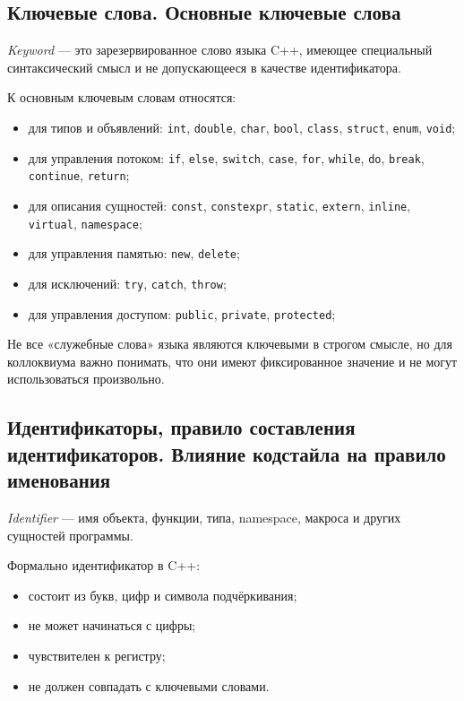 \subsection{Ключевые слова. Основные ключевые слова}
\begin{definition}
\textit{Keyword} — это зарезервированное слово языка C++, имеющее специальный синтаксический смысл и не допускающееся в качестве идентификатора.
\end{definition}

К основным ключевым словам относятся:
\begin{itemize}
    \item для типов и объявлений: \texttt{int}, \texttt{double}, \texttt{char}, \texttt{bool}, \texttt{class}, \texttt{struct}, \texttt{enum}, \texttt{void};
    \item для управления потоком: \texttt{if}, \texttt{else}, \texttt{switch}, \texttt{case}, \texttt{for}, \texttt{while}, \texttt{do}, \texttt{break}, \texttt{continue}, \texttt{return};
    \item для описания сущностей: \texttt{const}, \texttt{constexpr}, \texttt{static}, \texttt{extern}, \texttt{inline}, \texttt{virtual}, \texttt{namespace};
    \item для управления памятью: \texttt{new}, \texttt{delete};
    \item для исключений: \texttt{try}, \texttt{catch}, \texttt{throw};
    \item для управления доступом: \texttt{public}, \texttt{private}, \texttt{protected};
\end{itemize}

\begin{remark}
Не все «служебные слова» языка являются ключевыми в строгом смысле, но для коллоквиума важно понимать, что они имеют фиксированное значение и не могут использоваться произвольно.
\end{remark}

\subsection{Идентификаторы, правило составления идентификаторов. Влияние кодстайла на правило именования}
\begin{definition}[Идентификатор]
\textit{Identifier} — имя объекта, функции, типа, namespace, макроса и других сущностей программы.
\end{definition}

Формально идентификатор в C++:
\begin{itemize}
    \item состоит из букв, цифр и символа подчёркивания;
    \item не может начинаться с цифры;
    \item чувствителен к регистру;
    \item не должен совпадать с ключевыми словами.
\end{itemize}

